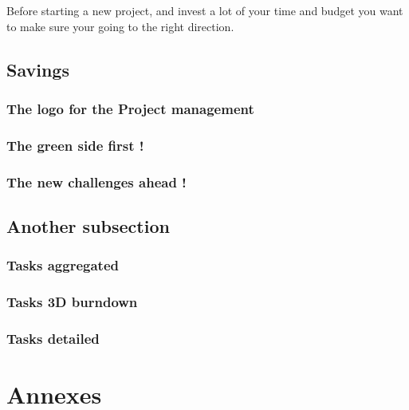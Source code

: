 \documentclass[8pt]{article} %
\begin{document}
Before starting a new project, and invest a lot of your time and budget you want to make sure your going to the right direction. 

\subsection{Savings}

\subsubsection{The logo for the Project management}
\subsubsection{The green side first !}
\subsubsection{The new challenges ahead !}

\subsection{Another subsection}

\subsubsection{Tasks aggregated}
\subsubsection{Tasks 3D burndown}
\subsubsection{Tasks detailed}

\section{Annexes}
\end{document}
